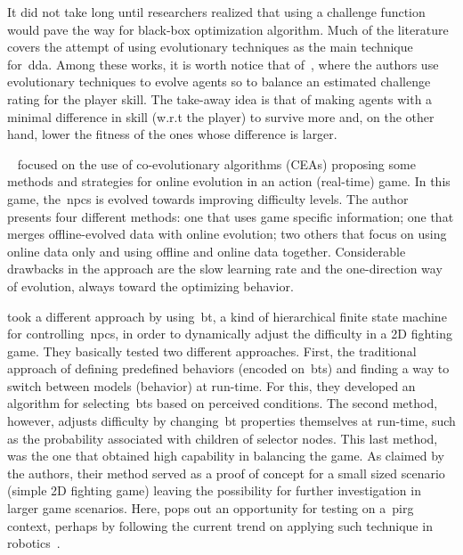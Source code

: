 It did not take long until researchers realized that using a challenge function would pave the way for black-box optimization algorithm. Much of the literature covers the attempt of using evolutionary techniques as the main technique for~\gls{dda}. Among these works, it is worth notice that of~\cite{olesen_real-time_2008}, where the authors use evolutionary techniques to evolve agents so to balance an estimated challenge rating for the player skill. The take-away idea is that of making agents with a minimal difference in skill (w.r.t the player) to survive more and, on the other hand, lower the fitness of the ones whose difference is larger.%

~\cite{demasi_-line_2003} focused on the use of co-evolutionary algorithms (CEAs) proposing some methods and strategies for online evolution in an action (real-time) game. In this game, the~\gls{npc}s is evolved towards improving difficulty levels. The author presents four different methods: one that uses game specific information; one that merges offline-evolved data with online evolution; two others that focus on using online data only and using offline and online data together. Considerable drawbacks in the approach are the slow learning rate and the one-direction way of evolution, always toward the optimizing behavior. %

\cite{sejrsgaard-jacobsen_dynamic_2011} took a different approach by using~\gls{bt}, a kind of hierarchical finite state machine for controlling~\gls{npc}s, in order to dynamically adjust the difficulty in a 2D fighting game. They basically tested two different approaches. First, the traditional approach of defining predefined behaviors (encoded on~\gls{bt}s) and finding a way to switch between models (behavior) at run-time. For this, they developed an algorithm for selecting~\gls{bt}s based on perceived conditions. The second method, however, adjusts difficulty by changing~\gls{bt} properties themselves at run-time, such as the probability associated with children of selector nodes. This last method, was the one that obtained high capability in balancing the game. As claimed by the authors, their method served as a proof of concept for a small sized scenario (simple 2D fighting game) leaving the possibility for further investigation in larger game scenarios. Here, pops out an opportunity for testing on a~\gls{pirg} context, perhaps by following the current trend on applying such technique in robotics~\citep{scheper_behavior_2015, pereira_framework_2015, marzinotto_towards_2014}. %

